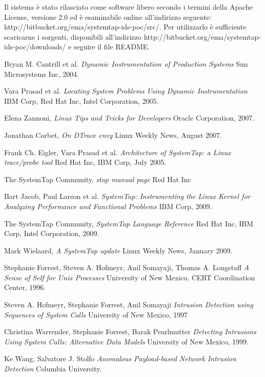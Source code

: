 \documentclass[11pt]{article}
\begin{document}
Il sistema è stato rilasciato come software libero secondo i termini della
Apache License, versione 2.0 ed è esaminabile online all'indirizzo seguente:
http://bitbucket.org/ema/systemtap-ids-poc/src/. Per utilizzarlo è sufficiente
scaricarne i sorgenti, disponibili all'indirizzo
http://bitbucket.org/ema/systemtap-ids-poc/downloads/ e seguire il file README.

\pagebreak

\begin{thebibliography}{99}

  Bryan M. Cantrill et al.
  \emph{Dynamic Instrumentation of Production Systems}
  Sun Microsystems Inc,
  2004.

  Vara Prasad et al.
  \emph{Locating System Problems Using Dynamic Instrumentation}
  IBM Corp, Red Hat Inc, Intel Corporation,
  2005. 

  Elena Zannoni,
  \emph{Linux Tips and Tricks for Developers}
  Oracle Corporation,
  2007.

  Jonathan Corbet,
  \emph{On DTrace envy}
  Linux Weekly News, 
  August 2007.

  Frank Ch. Eigler, Vara Prasad et al.
  \emph{Architecture of SystemTap: a Linux trace/probe tool}
  Red Hat Inc, IBM Corp,
  July 2005.

  The SystemTap Community,
  \emph{stap manual page}
  Red Hat Inc

  Bart Jacob, Paul Larson et al.
  \emph{SystemTap: Instrumenting the Linux Kernel for Analyzing Performance and
  Functional Problems}
  IBM Corp,
  2009.

  The SystemTap Community,
  \emph{SystemTap Language Reference}
  Red Hat Inc, IBM Corp, Intel Corporation,
  2009.

  Mark Wielaard,
  \emph{A SystemTap update}
  Linux Weekly News, 
  January 2009.

  Stephanie Forrest, Steven A. Hofmeyr, Anil Somayaji, Thomas A. Longstaff
  \emph{A Sense of Self for Unix Processes}
  University of New Mexico, CERT Coordination Center,
  1996.

  Steven A. Hofmeyr, Stephanie Forrest, Anil Somayaji
  \emph{Intrusion Detection using Sequences of System Calls}
  University of New Mexico,
  1997

  Christina Warrender, Stephanie Forrest, Barak Pearlmutter
  \emph{Detecting Intrusions Using System Calls: Alternative Data Models}
  University of New Mexico,
  1999.

  Ke Wang, Salvatore J. Stolfo
  \emph{Anomalous Payload-based Network Intrusion Detection}
  Columbia University.

\end{thebibliography}
\end{document}
